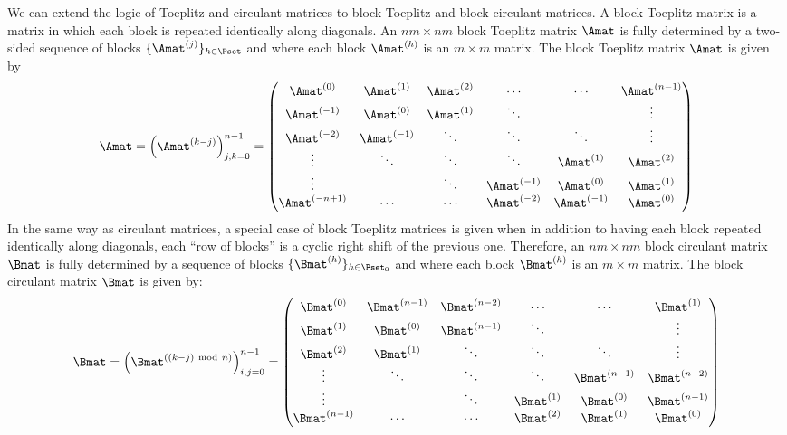 We can extend the logic of Toeplitz and circulant matrices to block Toeplitz and block circulant matrices.
A block Toeplitz matrix is a matrix in which each block is repeated identically along diagonals.
An $nm \times nm$ block Toeplitz matrix $\Amat$ is fully determined by a two-sided sequence of blocks $\{\Amat^{(j)}\}_{h \in \Pset}$ and where each block $\Amat^{(h)}$ is an $m \times m$ matrix.
The block Toeplitz matrix $\Amat$ is given by
\begin{equation} \label{equation:ch2-block_toeplitz_matrices}
  \Amat = \leftmat \Amat^{(k-j)} \rightmat_{j,k = 0}^{n-1} = 
  \leftmatrix
    \Amat^{(0)}    & \Amat^{(1)}  & \Amat^{(2)} & \cdots       & \cdots       & \Amat^{(n-1)} \\
    \Amat^{(-1)}   & \Amat^{(0)}  & \Amat^{(1)} & \ddots       &              & \vdots        \\
    \Amat^{(-2)}   & \Amat^{(-1)} & \ddots      & \ddots       & \ddots       & \vdots        \\ 
    \vdots         & \ddots       & \ddots      & \ddots       & \Amat^{(1)}  & \Amat^{(2)}   \\
    \vdots         &              & \ddots      & \Amat^{(-1)} & \Amat^{(0)}  & \Amat^{(1)}   \\
    \Amat^{(-n+1)} & \cdots       & \cdots      & \Amat^{(-2)} & \Amat^{(-1)} & \Amat^{(0)}
  \rightmatrix
\end{equation}
In the same way as circulant matrices, a special case of block Toeplitz matrices is given when in addition to having each block repeated identically along diagonals, each ``row of blocks'' is a cyclic right shift of the previous one. 
Therefore, an $nm \times nm$ block circulant matrix $\Bmat$ is fully determined by a sequence of blocks $\{\Bmat^{(h)}\}_{h \in \Pset_0}$ and where each block $\Bmat^{(h)}$ is an $m \times m$ matrix.
The block circulant matrix $\Bmat$ is given by:
\begin{equation}
  \Bmat = \leftmat \Bmat^{((k-j) \mod n)} \rightmat_{i, j = 0}^{n-1} = 
  \leftmatrix
    \Bmat^{(0)}   & \Bmat^{(n-1)} & \Bmat^{(n-2)} & \cdots      & \cdots        & \Bmat^{(1)}   \\
    \Bmat^{(1)}   & \Bmat^{(0)}   & \Bmat^{(n-1)} & \ddots      &               & \vdots        \\
    \Bmat^{(2)}   & \Bmat^{(1)}   & \ddots        & \ddots      & \ddots        & \vdots        \\ 
    \vdots        & \ddots        & \ddots        & \ddots      & \Bmat^{(n-1)} & \Bmat^{(n-2)} \\
    \vdots        &               & \ddots        & \Bmat^{(1)} & \Bmat^{(0)}   & \Bmat^{(n-1)} \\
    \Bmat^{(n-1)} & \cdots        & \cdots        & \Bmat^{(2)} & \Bmat^{(1)}   & \Bmat^{(0)}
  \rightmatrix
\end{equation}

